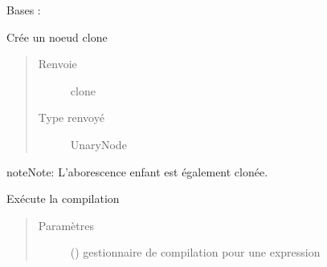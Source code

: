 \documentclass[letterpaper,10pt,french]{sphinxmanual}
\begin{document}
\begin{fulllineitems}
\label{\detokenize{arithmeticexpressionnodes:arithmeticexpressionnodes.NegNode}}
Bases : {\hyperref[\detokenize{arithmeticexpressionnodes:arithmeticexpressionnodes.ArithmeticExpressionNode}]{}}

\begin{fulllineitems}
\label{\detokenize{arithmeticexpressionnodes:arithmeticexpressionnodes.NegNode.clone}}
Crée un noeud clone
\begin{quote}\begin{description}
\item[{Renvoie}] \leavevmode
clone

\item[{Type renvoyé}] \leavevmode
UnaryNode

\end{description}\end{quote}

\begin{sphinxadmonition}{note}{Note:}
L’aborescence enfant est également clonée.
\end{sphinxadmonition}

\end{fulllineitems}


\begin{fulllineitems}
\label{\detokenize{arithmeticexpressionnodes:arithmeticexpressionnodes.NegNode.compile}}
Exécute la compilation
\begin{quote}\begin{description}
\item[{Paramètres}] \leavevmode
{} () \textendash{} gestionnaire de compilation pour une expression


\end{description}
\end{quote}
\end{fulllineitems}
\end{fulllineitems}
\end{document}
